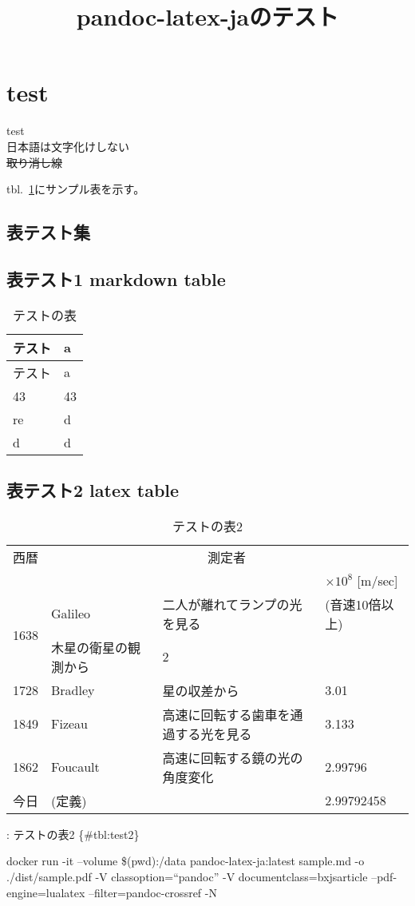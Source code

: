\documentclass[
  pandoc]{bxjsarticle}
\title{pandoc-latex-jaのテスト}
\author{}
\date{}
\begin{document}
\maketitle

\hypertarget{test}{%
\section{test}\label{test}}

test\\
日本語は文字化けしない\\
\sout{取り消し線}

tbl.~\ref{tbl:test1}にサンプル表を示す。

\hypertarget{ux8868ux30c6ux30b9ux30c8ux96c6}{%
\subsection{表テスト集}\label{ux8868ux30c6ux30b9ux30c8ux96c6}}

\hypertarget{ux8868ux30c6ux30b9ux30c81-markdown-table}{%
\subsection{表テスト1 markdown
table}\label{ux8868ux30c6ux30b9ux30c81-markdown-table}}

\hypertarget{tbl:test1}{}
\begin{longtable}[]{@{}ll@{}}
\caption{\label{tbl:test1}テストの表}\tabularnewline
\toprule
テスト & a \\
\midrule
\endfirsthead
\toprule
テスト & a \\
\midrule
\endhead
43 & 43 \\
re & d \\
d & d \\
\bottomrule
\end{longtable}

\hypertarget{ux8868ux30c6ux30b9ux30c82-latex-table}{%
\subsection{表テスト2 latex
table}\label{ux8868ux30c6ux30b9ux30c82-latex-table}}

\begin{table}[h]
 \label{table:SpeedOfLight}
 \centering
 \caption{テストの表2}
  \begin{tabular}{cp{50mm}ll}
   \hline
   西暦 & \multicolumn{3}{c}{測定者}    \\ 
    & & & $\times 10^8$ [m/sec] \\
   \hline \hline
   \multirow{2}{*}{1638} & Galileo & 二人が離れてランプの光を見る & (音速10倍以上) \\
   Roemer & 木星の衛星の観測から & 2 \\
   1728 & Bradley & 星の収差から & 3.01 \\
   1849 & Fizeau & 高速に回転する歯車を通過する光を見る & 3.133 \\
   1862 & Foucault & 高速に回転する鏡の光の角度変化 & 2.99796 \\
   今日 & (定義) & & 2.99792458 \\
   \hline
  \end{tabular}
\end{table}

: テストの表2 \{\#tbl:test2\}

docker run -it --volume \$(pwd):/data pandoc-latex-ja:latest sample.md
-o ./dist/sample.pdf -V classoption=``pandoc'' -V
documentclass=bxjsarticle --pdf-engine=lualatex --filter=pandoc-crossref
-N
\end{document}
